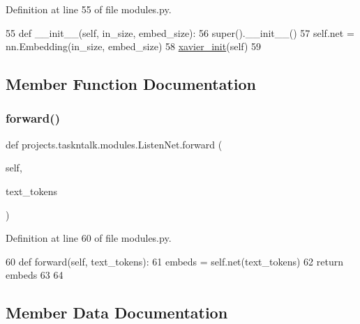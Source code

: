 Definition at line 55 of file modules.\+py.


\begin{DoxyCode}
55     \textcolor{keyword}{def }\_\_init\_\_(self, in\_size, embed\_size):
56         super().\_\_init\_\_()
57         self.net = nn.Embedding(in\_size, embed\_size)
58         \hyperlink{namespaceprojects_1_1taskntalk_1_1modules_a483197f0d561a3d1ef7d04a2de70e571}{xavier\_init}(self)
59 
\end{DoxyCode}


\subsection{Member Function Documentation}
\mbox{\label{classprojects_1_1taskntalk_1_1modules_1_1ListenNet_ad2d13c813b626f6b92bd17f6693c179c}} 
\subsubsection{\texorpdfstring{forward()}{forward()}}
{\footnotesize\ttfamily def projects.\+taskntalk.\+modules.\+Listen\+Net.\+forward (\begin{DoxyParamCaption}\item[{}]{self,  }\item[{}]{text\+\_\+tokens }\end{DoxyParamCaption})}



Definition at line 60 of file modules.\+py.


\begin{DoxyCode}
60     \textcolor{keyword}{def }forward(self, text\_tokens):
61         embeds = self.net(text\_tokens)
62         \textcolor{keywordflow}{return} embeds
63 
64 
\end{DoxyCode}


\subsection{Member Data Documentation}
\mbox{\label{classprojects_1_1taskntalk_1_1modules_1_1ListenNet_a01d428f1730b2a3abf26c86ed72adf1b}} 
